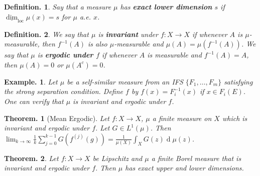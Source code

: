 \documentclass[11pt, a4paper]{memoir}
\theoremstyle{change}
\newtheorem{theorem}{Theorem.}[section]
\theoremstyle{plain}
\theoremstyle{nonumberplain}
\newtheorem{definition}{Definition.}
\newtheorem{example}{Example.}
\renewcommand{\d}[1]{\ensuremath{\operatorname{d}\!{#1}}}
\newcommand{\defn}[1]{{\boldmath\bfseries #1}}
\DeclareMathOperator{\loc}{loc}
\numberwithin{equation}{section}
\begin{document}
\begin{definition}
    Say that a measure $\mu$ has \defn{exact lower dimension} $s$ if $\underline{\dim}_{\loc}\mu(x)=s$ for $\mu$ a.e. $x$.
\end{definition}
\begin{definition}
    We say that $\mu$ is \defn{invariant} under $f:X\to X$ if whenever $A$ is $\mu$-measurable, then $f^{-1}(A)$ is also $\mu$-measurable and $\mu(A)=\mu(f^{-1}(A))$.
    We say that $\mu$ is \defn{ergodic under $f$} if whenever $A$ is measurable and $f^{-1}(A)=A$, then $\mu(A)=0$ or $\mu(A^c)=0$.
\end{definition}
\begin{example}
    Let $\mu$ be a self-similar measure from an IFS $\{F_1,\ldots,F_m\}$ satisfying the strong separation condition.
    Define $f$ by $f(x)=F_i^{-1}(x)$ if $x\in F_i(E)$.
    One can verify that $\mu$ is invariant and ergodic under $f$.
\end{example}
\begin{theorem}[Mean Ergodic]
    Let $f:X\to X$, $\mu$ a finite measure on $X$ which is invariant and ergodic under $f$.
    Let $G\in L^1(\mu)$.
    Then $\lim_{k\to\infty}\frac{1}{k}\sum_{j=0}^{k-1}G(f^{(j)}(g))=\frac{1}{\mu(X)}\int_XG(z)\d{\mu(z)}$.
\end{theorem}
\begin{theorem}
    Let $f:X\to X$ be Lipschitz and $\mu$ a finite Borel measure that is invariant and ergodic under $f$.
    Then $\mu$ has exact upper and lower dimensions.
\end{theorem}
\end{document}
